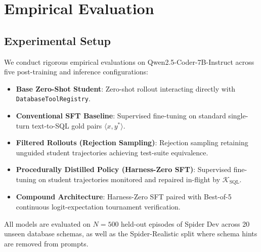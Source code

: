 \documentclass{article}
\theoremstyle{plain}
\theoremstyle{definition}
\theoremstyle{remark}
\begin{document}
\section{Empirical Evaluation}
\label{sec:experiments}

\subsection{Experimental Setup}
We conduct rigorous empirical evaluations on Qwen2.5-Coder-7B-Instruct across five post-training and inference configurations:
\begin{itemize}[leftmargin=*,itemsep=1pt]
    \item \textbf{Base Zero-Shot Student}: Zero-shot rollout interacting directly with \texttt{DatabaseToolRegistry}.
    \item \textbf{Conventional SFT Baseline}: Supervised fine-tuning on standard single-turn text-to-SQL gold pairs $\langle x, y^* \rangle$.
    \item \textbf{Filtered Rollouts (Rejection Sampling)}: Rejection sampling retaining unguided student trajectories achieving test-suite equivalence.
    \item \textbf{Procedurally Distilled Policy (Harness-Zero SFT)}: Supervised fine-tuning on student trajectories monitored and repaired in-flight by $\mathcal{K}_{\text{SQL}}$.
    \item \textbf{Compound Architecture}: Harness-Zero SFT paired with Best-of-5 continuous logit-expectation tournament verification.
\end{itemize}

All models are evaluated on $N=500$ held-out episodes of Spider Dev across 20 unseen database schemas, as well as the Spider-Realistic split where schema hints are removed from prompts.
\end{document}
